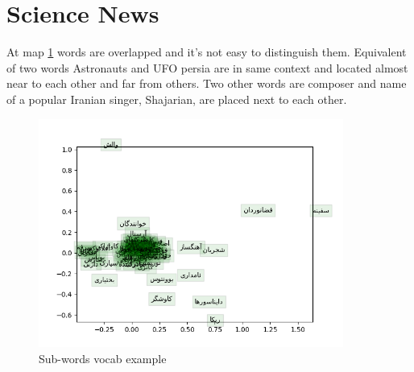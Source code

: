 \section{Science News}
At map \ref{fig:word2vecsience} words are overlapped and it's not easy to distinguish them. Equivalent of two words Astronauts and UFO persia are in same context and located almost near to each other and far from others. Two other words are composer and name of a popular Iranian singer, Shajarian, are placed next to each other.
\begin{figure}[h]
	\centering
	\includegraphics[width=10cm]{../reports/word2vec/word_vectors_دانش.png}
	\caption{Sub-words vocab example}
	\label{fig:word2vecsience}
\end{figure}
